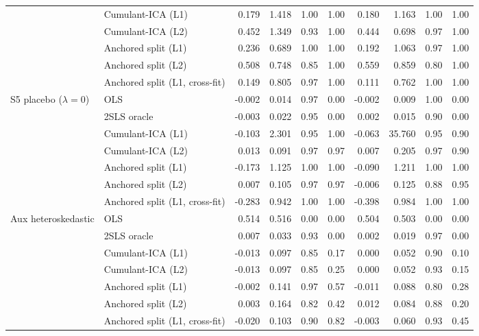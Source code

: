 \begin{table}[p]
\begin{tabular}{@{}llrrrrrrrr@{}}
 & Cumulant-ICA (L1) & 0.179 & 1.418 & 1.00 & 1.00 & 0.180 & 1.163 & 1.00 & 1.00 \\
 & Cumulant-ICA (L2) & 0.452 & 1.349 & 0.93 & 1.00 & 0.444 & 0.698 & 0.97 & 1.00 \\
 & Anchored split (L1) & 0.236 & 0.689 & 1.00 & 1.00 & 0.192 & 1.063 & 0.97 & 1.00 \\
 & Anchored split (L2) & 0.508 & 0.748 & 0.85 & 1.00 & 0.559 & 0.859 & 0.80 & 1.00 \\
 & Anchored split (L1, cross-fit) & 0.149 & 0.805 & 0.97 & 1.00 & 0.111 & 0.762 & 1.00 & 1.00 \\
\addlinespace
S5 placebo ($\lambda=0$) & OLS & -0.002 & 0.014 & 0.97 & 0.00 & -0.002 & 0.009 & 1.00 & 0.00 \\
 & 2SLS oracle & -0.003 & 0.022 & 0.95 & 0.00 & 0.002 & 0.015 & 0.90 & 0.00 \\
 & Cumulant-ICA (L1) & -0.103 & 2.301 & 0.95 & 1.00 & -0.063 & 35.760 & 0.95 & 0.90 \\
 & Cumulant-ICA (L2) & 0.013 & 0.091 & 0.97 & 0.97 & 0.007 & 0.205 & 0.97 & 0.90 \\
 & Anchored split (L1) & -0.173 & 1.125 & 1.00 & 1.00 & -0.090 & 1.211 & 1.00 & 1.00 \\
 & Anchored split (L2) & 0.007 & 0.105 & 0.97 & 0.97 & -0.006 & 0.125 & 0.88 & 0.95 \\
 & Anchored split (L1, cross-fit) & -0.283 & 0.942 & 1.00 & 1.00 & -0.398 & 0.984 & 1.00 & 1.00 \\
\addlinespace
Aux heteroskedastic & OLS & 0.514 & 0.516 & 0.00 & 0.00 & 0.504 & 0.503 & 0.00 & 0.00 \\
 & 2SLS oracle & 0.007 & 0.033 & 0.93 & 0.00 & 0.002 & 0.019 & 0.97 & 0.00 \\
 & Cumulant-ICA (L1) & -0.013 & 0.097 & 0.85 & 0.17 & 0.000 & 0.052 & 0.90 & 0.10 \\
 & Cumulant-ICA (L2) & -0.013 & 0.097 & 0.85 & 0.25 & 0.000 & 0.052 & 0.93 & 0.15 \\
 & Anchored split (L1) & -0.002 & 0.141 & 0.97 & 0.57 & -0.011 & 0.088 & 0.80 & 0.28 \\
 & Anchored split (L2) & 0.003 & 0.164 & 0.82 & 0.42 & 0.012 & 0.084 & 0.88 & 0.20 \\
 & Anchored split (L1, cross-fit) & -0.020 & 0.103 & 0.90 & 0.82 & -0.003 & 0.060 & 0.93 & 0.45 \\
\bottomrule
\end{tabular}
\end{table}

